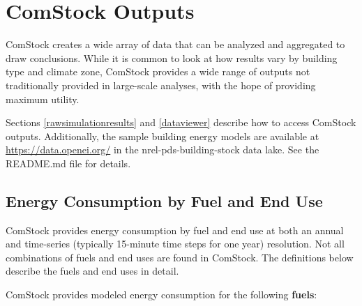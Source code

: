 \chapter{ComStock Outputs}
ComStock creates a wide array of data that can be analyzed and aggregated to draw conclusions. While it is common to look at how results vary by building type and climate zone, ComStock provides a wide range of outputs not traditionally provided in large-scale analyses, with the hope of providing maximum utility.

Sections \ref{rawsimulationresults} and \ref{dataviewer} describe how to access ComStock outputs. Additionally, the sample building energy models are available at \url{https://data.openei.org/} in the nrel-pds-building-stock data lake. See the README.md file for details.

\section{Energy Consumption by Fuel and End Use}
ComStock provides energy consumption by fuel and end use at both an annual and time-series (typically 15-minute time steps for one year) resolution. Not all combinations of fuels and end uses are found in ComStock. The definitions below describe the fuels and end uses in detail.

ComStock provides modeled energy consumption for the following \textbf{fuels}:

